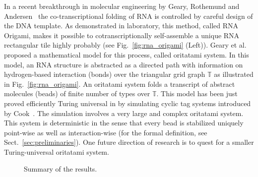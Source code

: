 \documentclass[runningheads]{llncs}
\begin{document}
In a recent breakthrough in molecular engineering by Geary, Rothemund and Andersen~\cite{GearyRothemundAndersen2014} the co-transcriptional folding of RNA is controlled by careful design of the DNA template. As demonstrated in laboratory, this method, called RNA Origami, makes it possible to cotranscriptionally self-assemble a unique RNA rectangular tile highly probably (see Fig.~\ref{fig:rna_origami} (Left)). 
Geary et al.~\cite{GeMeScSe2016} proposed a mathematical model for this process, called oritatami system. 
In this model, an RNA structure is abstracted as a directed path with information on hydrogen-based interaction (bonds) over the triangular grid graph $\mathbb{T}$ as illustrated in Fig.~\ref{fig:rna_origami}. 
An oritatami system folds a transcript of abstract molecules (beads) of finite number of types over $\mathbb{T}$. 
This model has been just proved efficiently Turing universal in \cite{GeMeScSe2018} by simulating cyclic tag systems introduced by Cook~\cite{Cook2004}. 
The simulation involves a very large and complex oritatami system. 
This system is deterministic in the sense that every bead is stabilized uniquely point-wise as well as interaction-wise (for the formal definition, see Sect.~\ref{sec:preliminaries}). 
One future direction of research is to quest for a smaller Turing-universal oritatami system.

\begin{figure}[tb]
\caption{Summary of the results.}
\label{fig:summary}
\end{figure}
\end{document}
